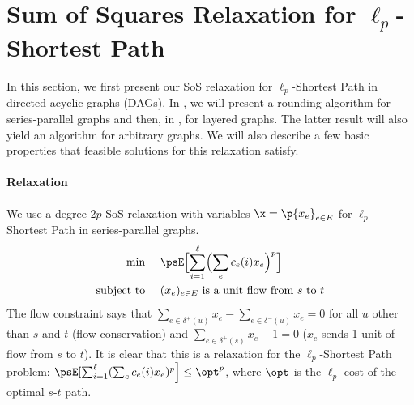 \documentclass[11pt,a4paper]{article}
\begin{document}
\section{Sum of Squares Relaxation for \texorpdfstring{$\ell_p$}{l-p}-Shortest Path}\label{sec:sos-relaxation}
In this section, we first present our SoS relaxation for $\ell_p$-Shortest Path in directed acyclic graphs (DAGs). In , we will present a rounding algorithm for series-parallel graphs and then, in , for  layered graphs. The latter result will also yield an algorithm for arbitrary graphs. We will also describe a few basic properties that feasible solutions for this relaxation satisfy.
\paragraph{Relaxation}
We use a degree $2p$ SoS relaxation with variables $\x = \p{x_e}_{e\in E}$ for $\ell_p$-Shortest Path in series-parallel graphs. 
\begin{align*}
    \text{min }\quad& \psE\Bigl[\sum_{i=1}^\ell \Bigl(\sum_e c_e(i) x_e\Bigr)^p\Bigr]\\
    \text{subject to }\quad&
    (x_e)_{e\in E} \text{ is a unit flow from } s \text{ to } t
\end{align*}
The flow constraint says that $\sum_{e\in \delta^+(u)} x_e - \sum_{e\in \delta^-(u)} x_e = 0$ for all $u$ other than $s$ and $t$ (flow conservation) and $\sum_{e\in \delta^+(s)} x_e - 1 = 0$ ($x_e$ sends 1 unit of flow from $s$ to $t$).
%
It is clear that this is a relaxation for the $\ell_p$-Shortest Path problem: $\psE[\sum_{i=1}^\ell (\sum_e c_e(i) x_e)^p\Bigr] \leq \opt^p$, where $\opt$ is the $\ell_p$-cost of the optimal $s$-$t$ path.
\end{document}
